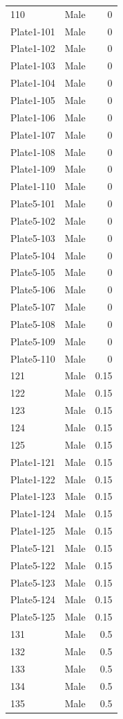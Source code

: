 \begin{longtable}{l l r}
110 & Male & 0 \\
Plate1-101 & Male & 0 \\
Plate1-102 & Male & 0 \\
Plate1-103 & Male & 0 \\
Plate1-104 & Male & 0 \\
Plate1-105 & Male & 0 \\
Plate1-106 & Male & 0 \\
Plate1-107 & Male & 0 \\
Plate1-108 & Male & 0 \\
Plate1-109 & Male & 0 \\
Plate1-110 & Male & 0 \\
Plate5-101 & Male & 0 \\
Plate5-102 & Male & 0 \\
Plate5-103 & Male & 0 \\
Plate5-104 & Male & 0 \\
Plate5-105 & Male & 0 \\
Plate5-106 & Male & 0 \\
Plate5-107 & Male & 0 \\
Plate5-108 & Male & 0 \\
Plate5-109 & Male & 0 \\
Plate5-110 & Male & 0 \\
121 & Male & 0.15 \\
122 & Male & 0.15 \\
123 & Male & 0.15 \\
124 & Male & 0.15 \\
125 & Male & 0.15 \\
Plate1-121 & Male & 0.15 \\
Plate1-122 & Male & 0.15 \\
Plate1-123 & Male & 0.15 \\
Plate1-124 & Male & 0.15 \\
Plate1-125 & Male & 0.15 \\
Plate5-121 & Male & 0.15 \\
Plate5-122 & Male & 0.15 \\
Plate5-123 & Male & 0.15 \\
Plate5-124 & Male & 0.15 \\
Plate5-125 & Male & 0.15 \\
131 & Male & 0.5 \\
132 & Male & 0.5 \\
133 & Male & 0.5 \\
134 & Male & 0.5 \\
135 & Male & 0.5 \\

\end{longtable}
